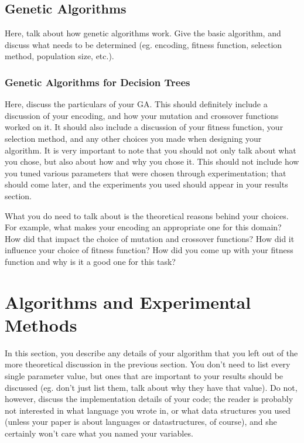 \documentclass[12pt, letterpaper]{article}
\begin{document}
\subsection{Genetic Algorithms}
Here, talk about how genetic algorithms work.  Give the basic algorithm, and
discuss what needs to be determined (eg. encoding, fitness function, selection
method, population size, etc.).

\subsubsection*{Genetic Algorithms for Decision Trees}
Here, discuss the particulars of your GA.  This should definitely include a
discussion of your encoding, and how your mutation and crossover functions
worked on it.  It should also include a discussion of your fitness function,
your selection method, and any other choices you made when designing your
algorithm.  It is very important to note that you should not only talk about
what you chose, but also about how and why you chose it.  This should not
include how you tuned various parameters that were chosen through
experimentation; that should come later, and the experiments you used should
appear in your results section.

What you do need to talk about is the theoretical reasons behind your choices.
For example, what makes your encoding an appropriate one for this domain?  How
did that impact the choice of mutation and crossover functions?  How did it
influence your choice of fitness function?  How did you come up with your
fitness function and why is it a good one for this task? 

\section{Algorithms and Experimental Methods}

In this section, you describe any details of your algorithm that you left out of
the more theoretical discussion in the previous section.  You don't need to list
every single parameter value, but ones that are important to your results should
be discussed (eg. don't just list them, talk about why they have that value).
Do not, however, discuss the implementation details of your code; the reader is
probably not interested in what language you wrote in, or what data structures
you used (unless your paper is about languages or datastructures, of course),
and she certainly won't care what you named your variables.
\end{document}
